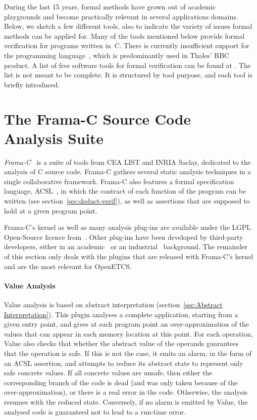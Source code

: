 During the last 15 years, formal methods have grown out of academic
playgrounds and become practically relevant in several applications
domains.
Below, we sketch a few different tools, also to indicate the variety
of issues formal methods can be applied for.
Many of the tools mentioned below provide formal verification for programs
written in~C.
There is currently insufficient support for the programming language~\cxx,
which is predominantly used in Thales' RBC product.
%
A list of free software tools for formal verification
can be found at \cite{gulliver}.
%
The list is not meant to be complete.
%
It is structured by tool purpose, and each tool is briefly
introduced.

\section{The Frama-C Source Code Analysis Suite}
\label{sec:Frama-C}

{\em Frama-C}~\cite{Cuoq.2012} is a suite of tools 
from CEA LIST and INRIA Saclay, dedicated to the analysis of C source code.
Frama-C gathers several static analysis techniques in a single
collaborative framework. Frama-C also features a formal specification language,
ACSL~\cite{ACSL}, in which the contract of each function of the program can
be written (see section~\ref{sec:deduct-verif}), as well as assertions that
are supposed to hold at a given program point.

Frama-C's kernel as well as many analysis plug-ins are available under the
LGPL Open-Source licence from~\cite{frama-c}. Other plug-ins have been
developed by third-party developers, either in an academic~\cite{Bouajjani.2011}
or an industrial~\cite{Ledinot.Pariente.2010} background. The remainder of this
section only deals with the plugins that are released with Frama-C's kernel and
are the most relevant for OpenETCS.

\paragraph{Value Analysis} 
Value analysis is based on abstract interpretation 
(section~\ref{sec:Abstract Interpretation}). This plugin analyses a
complete application, starting from a given entry point, and gives at
each program point an over-approximation of the values that can appear
in each memory location at this point. For each operation, Value also
checks that whether the abstract value of the operands guarantees that
the operation is safe. If this is not the case, it emits an alarm, in
the form of an ACSL assertion, and attempts to reduce its abstract
state to represent only safe concrete values. If all concrete values
are unsafe, then either the corresponding branch of the code is dead
(and was only taken because of the over-approximation), or there is a
real error in the code. Otherwise, the analysis resumes with the
reduced state. Conversely, if no alarm is emitted by Value, the
analysed code is guaranteed not to lead to a run-time error.

